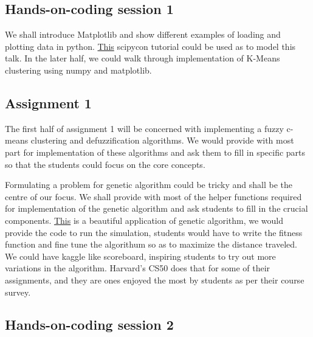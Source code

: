 \documentclass{article} %
\begin{document}
\subsection{Hands-on-coding session 1}

We shall introduce Matplotlib and show different examples of loading and plotting data in python.
\href{https://www.youtube.com/watch?v=p7Mj-4kASmI}{This} scipycon tutorial could be used as
to model this talk. In the later half, we could walk through implementation of K-Means clustering
using numpy and matplotlib.

\subsection{Assignment 1}

The first half of assignment 1 will be concerned with implementing a fuzzy c-means clustering and defuzzification algorithms.
We would provide with most part for implementation of these algorithms and ask them to fill in specific parts so that the students could
focus on the core concepts.

Formulating a problem for genetic algorithm could be tricky and shall be the centre of our focus.
We shall provide with most of the helper functions required for implementation of the genetic algorithm and
ask students to fill in the crucial components.
\href{http://rednuht.org/genetic_walkers/}{This} is a beautiful application of genetic algorithm, we would provide
the code to run the simulation, students would have to write the fitness function
and fine tune the algorithum so as to maximize the distance traveled. We could
have kaggle like scoreboard, inspiring students to try out more variations in
the algorithm. Harvard's CS50 does that for some of their assignments,
and they are ones enjoyed the most by students as per their course survey.


\subsection{Hands-on-coding session 2}
\end{document}
